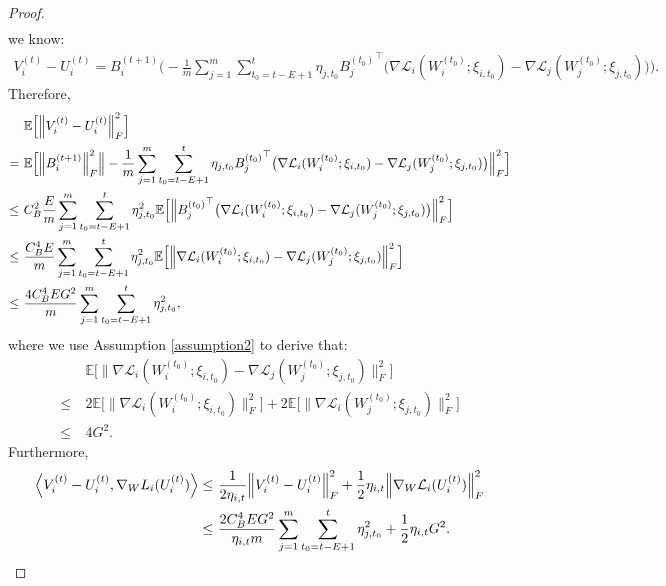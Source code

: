 \begin{proof}
\begin{align*}
\end{align*}
we know:
\begin{align*}
V_i^{(t)} - U_i^{(t)} = B_i^{(t+1)} \Big(-\frac{1}{m}\sum_{j=1}^m \sum_{t_0=t-E+1}^t \eta_{j,t_0}{B_j^{(t_0)}}^{\top}\big(\nabla \mathcal{L}_i(W_i^{(t_0)};\xi_{i,t_0})-\nabla \mathcal{L}_j(W_j^{(t_0)};\xi_{j,t_0})\big)\Big).
\end{align*}
Therefore,
\begin{align}\label{diff-square-norm-2}
& \mathbb{E}\Big[\Big\|V_i^{(t)}-U_i^{(t)}\Big\|_F^2\Big] \notag\\
= \ & \mathbb{E}\Big[\Big\|B_i^{(t+1)}\Big\|_F^2 \Big\|-\frac{1}{m}\sum_{j=1}^m \sum_{t_0=t-E+1}^t \eta_{j,t_0}{B_j^{(t_0)}}^{\top}\big(\nabla \mathcal{L}_i(W_i^{(t_0)};\xi_{i,t_0})-\nabla \mathcal{L}_j(W_j^{(t_0)};\xi_{j,t_0})\big)\Big\|_F^2\Big]\notag\\
\leq \ & C_B^2 \frac{E}{m}\sum_{j=1}^m \sum_{t_0=t-E+1}^t \eta_{j,t_0}^2 \mathbb{E}\Big[\Big\|{B_j^{(t_0)}}^{\top}\big(\nabla \mathcal{L}_i(W_i^{(t_0)};\xi_{i,t_0})-\nabla \mathcal{L}_j(W_j^{(t_0)};\xi_{j,t_0})\big)\Big\|_F^2\Big]\notag\\
\leq \ & \frac{C_B^4 E}{m}\sum_{j=1}^m \sum_{t_0=t-E+1}^t \eta_{j,t_0}^2 \mathbb{E}\Big[\Big\|\nabla \mathcal{L}_i(W_i^{(t_0)};\xi_{i,t_0})-\nabla \mathcal{L}_j(W_j^{(t_0)};\xi_{j,t_0})\Big\|_F^2\Big]\notag\\
\leq \ & \frac{4C_B^4 E G^2}{m}\sum_{j=1}^m \sum_{t_0=t-E+1}^t \eta_{j,t_0}^2,
\end{align}
where we use Assumption \ref{assumption2} to derive that:
\begin{align*}
& \mathbb{E}\Big[\Big\|\nabla \mathcal{L}_i(W_i^{(t_0)};\xi_{i,t_0})-\nabla \mathcal{L}_j(W_j^{(t_0)};\xi_{j,t_0})\Big\|_F^2\Big] \\
\leq \ & 2\mathbb{E}\Big[\Big\|\nabla \mathcal{L}_i(W_i^{(t_0)};\xi_{i,t_0})\Big\|_F^2\Big]+ 2\mathbb{E}\Big[\Big\|\nabla \mathcal{L}_i(W_j^{(t_0)};\xi_{j,t_0})\Big\|_F^2\Big]\\
\leq \ & 4G^2.
\end{align*}
Furthermore, 
\begin{align}\label{inner_product_3}
\left\langle V_i^{(t)}-U_i^{(t)}, \nabla_W L_i(U_i^{(t)})\right\rangle \notag
\leq \ & \frac{1}{2\eta_{i,t}}\Big\|V_i^{(t)}-U_i^{(t)}\Big\|_F^2 + \frac{1}{2}\eta_{i,t}\Big\|\nabla_W \mathcal{L}_i(U_i^{(t)})\Big\|_F^2 \notag\\
\leq \ & \frac{2C_B^4 E G^2}{\eta_{i,t}m}\sum_{j=1}^m \sum_{t_0=t-E+1}^t \eta_{j,t_0}^2 + \frac{1}{2}\eta_{i,t}G^2.
\end{align}

\end{proof}
